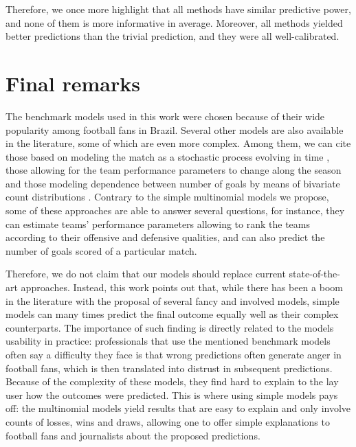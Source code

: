 \documentclass[journal,article,accept,moreauthors,pdftex,12pt,a4paper]{mdpi}
\begin{document}
	
	{\color{darkgreen}Therefore, we once more highlight that  
	all methods have similar predictive power, and none of them is more informative  in average. 
    Moreover, all methods yielded better predictions than the trivial prediction, and they were all well-calibrated.}
	
	\section{Final remarks}
	\label{sec::remarks}
	
	{\color{blue}The benchmark models used in this work were chosen because of their wide popularity among football fans in Brazil.
	Several other models are also available in the literature, some of which are even more complex.
	Among them, we can cite those based on modeling the match as a stochastic process evolving in time \citep{Dixon98, Volf2009, Titman2015}, those allowing for the team performance parameters to change along the season \citep{Rue2000, Crowder2002, Owen2011, Koopman2015} and those modeling dependence between number of goals by means of bivariate count distributions \citep{Dixon97, Karlis2003, McHale2007, McHale2011}. 
Contrary to the simple multinomial models we propose, some of these approaches are able to answer several questions, for instance, they can estimate teams' performance parameters allowing to rank the teams according to their offensive and defensive qualities, and can also predict the number of goals scored of a particular match. 

Therefore, we do not claim that our models should replace
	current state-of-the-art approaches. Instead, this work points out that, while there has been a boom in the literature with the proposal of several fancy and involved models,
	simple models can many times predict the final outcome equally well as their complex counterparts. 
	The importance of such finding is directly related to the models usability in practice: professionals that use the mentioned
	benchmark models often say a difficulty they face is that
	wrong predictions often generate anger in football fans, which is then translated into distrust
	in subsequent predictions. Because of the complexity of these models, they find hard to explain to the lay user how the outcomes were predicted.
	This is where using simple models pays off:  the multinomial models yield results that are
	easy to explain and only involve counts of losses, wins and draws, allowing one to offer simple explanations to football fans and journalists about the proposed predictions.} 
	
\end{document}
